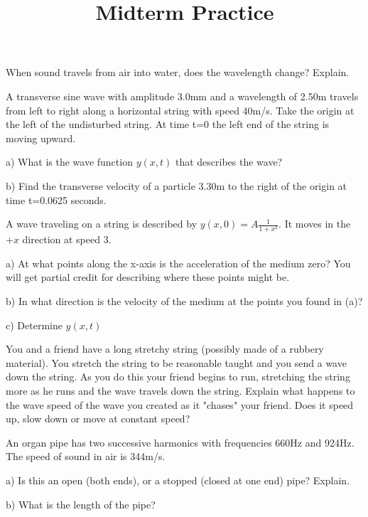\documentclass[10pt]{article}
\newenvironment{problem}[2][Problem]{\begin{trivlist}
\item[\hskip \labelsep {\bfseries #1}\hskip \labelsep {\bfseries #2.}]}{\end{trivlist}}
\begin{document}
 \title{Midterm Practice}
\date{}
\maketitle

\begin{problem}{1}
When sound travels from air into water, does the wavelength change? Explain.
\end{problem}

\begin{problem}{2}
A transverse sine wave with amplitude 3.0mm and a wavelength of 2.50m travels from left to right along a horizontal string with speed 40m/s. Take the origin at the left of the undisturbed string. At time t=0 the left end of the string is moving upward.
\item a) What is the wave function $y(x,t)$ that describes the wave?
\item b) Find the transverse velocity of a particle 3.30m to the right of the origin at time t=0.0625 seconds.
\end{problem}

\begin{problem}{3}
A wave traveling on a string is described by $y(x,0)=A\frac{1}{1+x^2}$. It moves in the $+x$ direction at speed 3.
\item a) At what points along the x-axis is the acceleration of the medium zero? You will get partial credit for describing where these points might be.
\item b) In what direction is the velocity of the medium at the points you found in (a)?
\item c) Determine $y(x,t)$
\end{problem}
 
\begin{problem}{4}
You and a friend have a long stretchy string (possibly made of a rubbery material). You stretch the string to be reasonable taught and you send a wave down the string. As you do this your friend begins to run, stretching the string more as he runs and the wave travels down the string. Explain what happens to the wave speed of the wave you created as it "chases" your friend. Does it speed up, slow down or move at constant speed?
\end{problem}

\begin{problem}{5}
An organ pipe has two successive harmonics with frequencies 660Hz and 924Hz. The speed of sound in air is 344m/s.
\item a) Is this an open (both ends), or a stopped (closed at one end) pipe? Explain.
\item b) What is the length of the pipe?
\end{problem}
\end{document}
